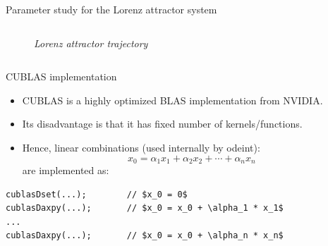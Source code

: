 \documentclass[@BEAMER_OPTIONS@]{beamer}
\begin{document}
\begin{frame}[fragile]{Parameter study for the Lorenz attractor system}
\begin{columns}
\begin{column}{0.4\textwidth}
\begin{figure}
\begin{center}
                    {\small \sl Lorenz attractor trajectory}
                \end{center}
            \end{figure}
        \end{column}
    \end{columns}
\end{frame}


\begin{frame}[fragile]{CUBLAS implementation}
    \begin{itemize}
        \item CUBLAS is a highly optimized BLAS implementation from NVIDIA.
        \item Its disadvantage is that it has fixed number of
            kernels/functions.
        \item Hence, linear combinations (used internally by odeint):
            \begin{equation*}
                x_0 = \alpha_1 x_1 + \alpha_2 x_2 + \cdots + \alpha_n x_n
            \end{equation*}
            are implemented as:
    \end{itemize}
    \begin{exampleblock}{}
        \begin{lstlisting}[numbers=none,texcl=true]
cublasDset(...);        // $x_0 = 0$
cublasDaxpy(...);       // $x_0 = x_0 + \alpha_1 * x_1$
...
cublasDaxpy(...);       // $x_0 = x_0 + \alpha_n * x_n$
        \end{lstlisting}
    \end{exampleblock}
\end{frame}

\note{ }
\end{document}
